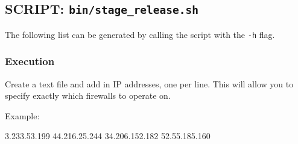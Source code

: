 \documentclass[
]{article}
\newenvironment{Shaded}{}{}
\newcommand{\ExtensionTok}[1]{#1}
\newcommand{\KeywordTok}[1]{\textcolor[rgb]{0.00,0.44,0.13}{\textbf{#1}}}
\newcommand{\NormalTok}[1]{#1}
\begin{document}
\hypertarget{script-binstage_release.sh}{%
\subsection{\texorpdfstring{SCRIPT:
\texttt{bin/stage\_release.sh}}{SCRIPT: bin/stage\_release.sh}}\label{script-binstage_release.sh}}

The following list can be generated by calling the script with the
\texttt{-h} flag.

\begin{Shaded}
\end{Shaded}

\hypertarget{execution}{%
\subsubsection{Execution}\label{execution}}

Create a text file and add in IP addresses, one per line. This will
allow you to specify exactly which firewalls to operate on.

Example:

\begin{Shaded}
\begin{Highlighting}[]
\ExtensionTok{3.233.53.199}
\ExtensionTok{44.216.25.244}
\ExtensionTok{34.206.152.182}
\ExtensionTok{52.55.185.160}
\end{Highlighting}
\end{Shaded}
\end{document}
